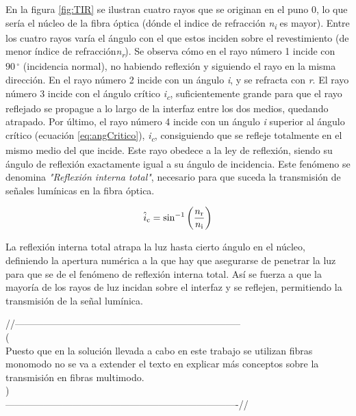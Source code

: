 \begin{itemize}
 En la figura \ref{fig:TIR} se ilustran cuatro rayos que se originan en el puno 0, lo que sería el núcleo de la fibra óptica (dónde el indice de refracción \textit{n\textsubscript{i}} es mayor). Entre los cuatro rayos varía el ángulo con el que estos inciden sobre el revestimiento (de menor índice de refracción\textit{n\textsubscript{r}}). Se observa cómo en el rayo número 1 incide con $90\,^{\circ}$ (incidencia normal), no habiendo reflexión y siguiendo el rayo en la misma dirección. En el rayo número 2 incide con un ángulo \textit{i}, y se refracta con \textit{r}. El rayo número 3 incide con el ángulo crítico \textit{i\textsubscript{c}}, suficientemente grande para que el rayo reflejado se propague a lo largo de la interfaz entre los dos medios, quedando atrapado. Por último, el rayo número 4 incide con un ángulo \textit{i} superior al ángulo crítico (ecuación \ref{eq:angCritico}), \textit{i\textsubscript{c}}, consiguiendo que se refleje totalmente en el mismo medio del que incide. Este rayo obedece a la ley de reflexión, siendo su ángulo de reflexión exactamente igual a su ángulo de incidencia. Este fenómeno se denomina \textit{"Reflexión interna total"}, necesario para que suceda la transmisión de señales lumínicas en la fibra óptica. 

	\begin{equation}
		\label{eq:angCritico}
		\hat{i}\textsubscript{c} =  \sin^{-1}\left(\dfrac{n\textsubscript{r}}{n\textsubscript{i}}\right)
	\end{equation}

 La reflexión interna total atrapa la luz hasta cierto ángulo en el núcleo, definiendo la apertura numérica a la que hay que asegurarse de penetrar la luz para que se de el fenómeno de reflexión interna total. Así se fuerza a que la mayoría de los rayos de luz incidan sobre el interfaz y se reflejen, permitiendo la transmisión de la señal lumínica. 
 
 
 
 \textcolor{rositaoscuro}{//----------------------------------------------------------------------- }\\ 
 (\\Puesto que en la solución llevada a cabo en este trabajo se utilizan fibras monomodo no se va a extender el texto en explicar más conceptos sobre la transmisión en fibras multimodo.\\)\\
 \textcolor{rositaoscuro}{-------------------------------------------------------------------------//}\\
 

\end{itemize}
